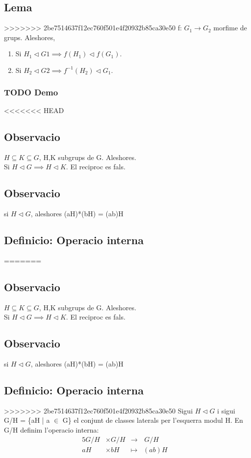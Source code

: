 \documentclass[11pt]{article}
\begin{document}
\subsection{Lema}
\label{sec:org70170a1}
>>>>>>> 2be7514637f12ec760f501e4f20932b85ca30e50
f: \(G_1 \to G_2\) morfime de grups. Aleshores,
\begin{enumerate}
\item Si \(H_1 \vartriangleleft G1 \implies f(H_1) \vartriangleleft f(G_1)\).
\item Si \(H_2 \vartriangleleft G2 \implies f^{-1}(H_2) \vartriangleleft G_1\).
\end{enumerate}
\subsubsection{{\bfseries\sffamily TODO} Demo}
<<<<<<< HEAD
\label{sec:org03556a0}
\subsection{Observacio}
\label{sec:org177d011}
\(H \subseteq K \subseteq G\), H,K subgrups de G. Aleshores. \\
Si \(H \vartriangleleft G \implies H \vartriangleleft K\). El reciproc es fals.
\subsection{Observacio}
\label{sec:orgf5c36e5}
si \(H \vartriangleleft G\), aleshores (aH)*(bH) = (ab)H
\subsection{Definicio: Operacio interna}
\label{sec:org6bda7f8}
=======
\label{sec:orgf6f7e65}

\subsection{Observacio}
\label{sec:orgd4f9a1e}
\(H \subseteq K \subseteq G\), H,K subgrups de G. Aleshores. \\
Si \(H \vartriangleleft G \implies H \vartriangleleft K\). El reciproc es fals.
\subsection{Observacio}
\label{sec:org4dd9b0d}
si \(H \vartriangleleft G\), aleshores (aH)*(bH) = (ab)H
\subsection{Definicio: Operacio interna}
\label{sec:org66e0d8d}
>>>>>>> 2be7514637f12ec760f501e4f20932b85ca30e50
Sigui \(H \vartriangleleft G\) i sigui G/H = \{aH | a \(\in\) G\} el conjunt de classes laterals per l'esquerra modul H. En G/H definim l'operacio interna:
\begin{alignat*}{5}
G/H &\times G/H &\to&\hspace{2pt}  G/H & \\
aH &\times bH &\mapsto&  (ab)H &
\end{alignat*}
\end{document}
